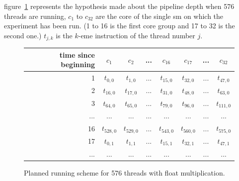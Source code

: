 \documentclass{report}
\begin{document}
    figure~\ref{fig:fp_prediction_512}
    represents the hypothesis made about the pipeline depth when 576 threads are running, $c_1$ to
    $c_{32}$ are the core of the single sm on which the experiment has been run. (1 to 16 is the
    first core group and 17 to 32 is the second one.) $t_{j,k}$ is the $k$-eme instruction of the thread number $j$. 
        \begin{figure}[h]
      \centering
       \begin{tabular}{ | r || c | c | c | c || c | c | c | }
    	    \hline
    	    time since beginning & $c_1$ & $c_2$ & ... & $c_{16}$ & $c_{17}$ & ... & $c_{32}$ \\ \hline  \hline
    	   1 & $t_{0,0}$ & $t_{1,0}$ & ... & $t_{15,0}$ & $t_{32, 0}$ & ... & $t_{47, 0}$ \\ \hline 
    	   2 & $t_{16,0}$ & $t_{17,0}$ & ... & $t_{31,0}$ & $t_{48, 0}$ & ... & $t_{63, 0}$ \\ \hline
    	   3 & $t_{64,0}$ & $t_{65,0}$ & ... & $t_{79,0}$ & $t_{96, 0}$ & ... & $t_{111, 0}$ \\ \hline
    	   ... & ... & ... & ... & ... & ... & ... & ... \\ \hline
    	   16 & $t_{528,0}$ & $t_{529,0}$ & ... & $t_{543,0}$ & $t_{560,0}$ & ... & $t_{575, 0}$ \\ \hline
    	   17 & $t_{0,1}$ & $t_{1,1}$ & ... & $t_{15,1}$ & $t_{32, 1}$ & ... & $t_{47, 1}$ \\ \hline
    	   ... & ... & ... & ... & ... & ... & ... & ... \\ \hline
  	\end{tabular}
  	\captionsetup{justification=centering}
  	\caption{Planned running scheme for 576 threads with float multiplication.}
  	\label{fig:fp_prediction_512}
   \end{figure}
   
\end{document}

